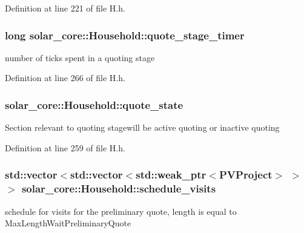 Definition at line 221 of file H.\+h.

\hypertarget{classsolar__core_1_1_household_a6b35426fd691daa6d352ec34a6ec6e4d}{}
\subsubsection[{quote\+\_\+stage\+\_\+timer}]{\setlength{\rightskip}{0pt plus 5cm}long solar\+\_\+core\+::\+Household\+::quote\+\_\+stage\+\_\+timer\hspace{0.3cm}{\ttfamily [protected]}}\label{classsolar__core_1_1_household_a6b35426fd691daa6d352ec34a6ec6e4d}
number of ticks spent in a quoting stage 

Definition at line 266 of file H.\+h.

\hypertarget{classsolar__core_1_1_household_a4ae618de9a28895317824b185b57ab24}{}
\subsubsection[{quote\+\_\+state}]{ solar\+\_\+core\+::\+Household\+::quote\+\_\+state\hspace{0.3cm}{\ttfamily [protected]}}\label{classsolar__core_1_1_household_a4ae618de9a28895317824b185b57ab24}
Section relevant to quoting stagewill be active quoting or inactive quoting 

Definition at line 259 of file H.\+h.

\hypertarget{classsolar__core_1_1_household_aadd4e3e2fc66ed214bcfadf37f557b14}{}
\subsubsection[{schedule\+\_\+visits}]{\setlength{\rightskip}{0pt plus 5cm}std\+::vector$<$std\+::vector$<$std\+::weak\+\_\+ptr$<${\bf P\+V\+Project}$>$ $>$ $>$ solar\+\_\+core\+::\+Household\+::schedule\+\_\+visits\hspace{0.3cm}{\ttfamily [protected]}}\label{classsolar__core_1_1_household_aadd4e3e2fc66ed214bcfadf37f557b14}
schedule for visits for the preliminary quote, length is equal to Max\+Length\+Wait\+Preliminary\+Quote 

